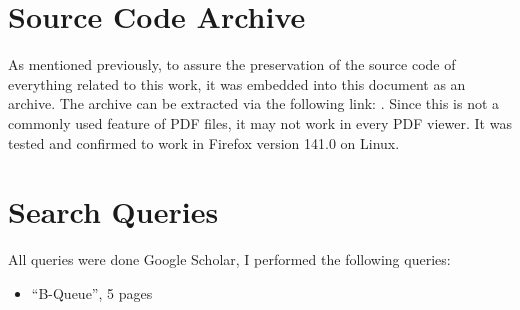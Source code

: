 \appendix

\section{Source Code Archive}
\label{app:source-code-archive}
As mentioned previously, to assure the preservation of the source code of everything related to this work, it was embedded into this document as an archive.
The archive can be extracted via the following link: .
Since this is not a commonly used feature of PDF files, it may not work in every PDF viewer.
It was tested and confirmed to work in Firefox version 141.0 on Linux.

\section{Search Queries}
\label{app:repro-search-queries}
All queries were done Google Scholar, I performed the following queries:
\begin{itemize}
    \item ``B-Queue'', 5 pages
\end{itemize}

